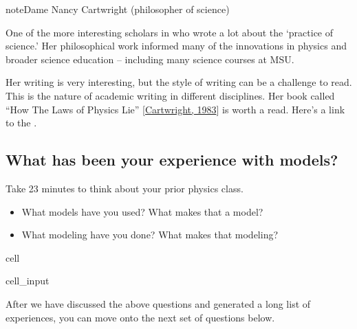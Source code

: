 \documentclass[letterpaper,10pt,english]{jupyterBook}
\begin{document}
\begin{sphinxadmonition}{note}{Dame Nancy Cartwright (philosopher of science)}

\sphinxAtStartPar
One of the more interesting scholars in  who wrote a lot about the ‘practice of science.’ Her philosophical work informed many of the innovations in physics and broader science education – including many science courses at MSU.

\sphinxAtStartPar
Her writing is very interesting, but the style of writing can be a challenge to read. This is the nature of academic writing in different disciplines. Her book called “How The Laws of Physics Lie” {[}\hyperlink{cite.content/X_additional_pages/references-page:id5}{Cartwright, 1983}{]} is worth a read. Here’s a link to the .
\end{sphinxadmonition}


\subsection{What has been your experience with models?}
\label{\detokenize{content/1_modeling/activity-what_is_a_model:what-has-been-your-experience-with-models}}
\sphinxAtStartPar
Take 2\sphinxhyphen{}3 minutes to think about your prior physics class.
\begin{itemize}
\item {} 
\sphinxAtStartPar
What models have you used? What makes that a model?

\item {} 
\sphinxAtStartPar
What modeling have you done? What makes that modeling?

\end{itemize}

\begin{sphinxuseclass}{cell}\begin{sphinxVerbatimInput}

\begin{sphinxuseclass}{cell_input}
\begin{sphinxVerbatim}[commandchars=\\\{\}]

\end{sphinxVerbatim}

\end{sphinxuseclass}\end{sphinxVerbatimInput}

\end{sphinxuseclass}
\sphinxAtStartPar
After we have discussed the above questions and generated a long list of experiences, you can move onto the next set of questions below.
\end{document}
